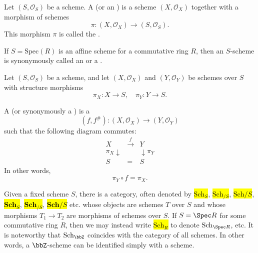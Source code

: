\begin{definition} \label{definition:scheme_over_a_scheme}
    Let $(S, \mathcal{O}_S)$ be a scheme. A  (or an ) is a scheme $(X, \mathcal{O}_X)$ together with a morphism of schemes
    $$\pi: (X, \mathcal{O}_X) \to (S, \mathcal{O}_S).$$
    This morphism $\pi$ is called the .  

    If $S = \mathrm{Spec}(R)$ is an affine scheme for a commutative ring $R$, then an $S$-scheme is synonymously called an  or a . 

    Let $(S, \mathcal{O}_S)$ be a scheme, and let $(X, \mathcal{O}_X)$ and $(Y, \mathcal{O}_Y)$ be schemes over $S$ with structure morphisms
    $$\pi_X: X \to S, \quad \pi_Y: Y \to S.$$

    A  (or synonymously a ) is a 
    $$(f, f^\#): (X, \mathcal{O}_X) \to (Y, \mathcal{O}_Y)$$
    such that the following diagram commutes:
    $$
    \begin{array}{ccc}
    X & \xrightarrow{f} & Y \\
    {\scriptstyle \pi_X} \downarrow & & \downarrow {\scriptstyle \pi_Y} \\
    S & = & S
    \end{array}
    $$
    In other words,
    $$\pi_Y \circ f = \pi_X.$$

    Given a fixed scheme $S$, there is a category, often denoted by \hl{$\mathrm{Sch}_S$}, \hl{$\mathrm{Sch}_{/S}$}, \hl{$\mathrm{Sch}/S$}, \hl{$\mathbf{Sch}_S$}, \hl{$\mathbf{Sch}_{/S}$}, \hl{$\mathbf{Sch}/S$} etc. whose objects are schemes $T$ over $S$ and whose morphisms $T_1 \to T_2$ are morphisms of schemes over $S$. If $S = \Spec R$ for some commutative ring $R$, then we may instead write \hl{$\mathrm{Sch}_R$} to denote $\mathrm{Sch}_{\Spec R}$, etc. It is noteworthy that $\mathrm{Sch}_\bbZ$ coincides with the category  of all schemes. In other words, a $\bbZ$-scheme can be identified simply with a scheme. 


\end{definition}
